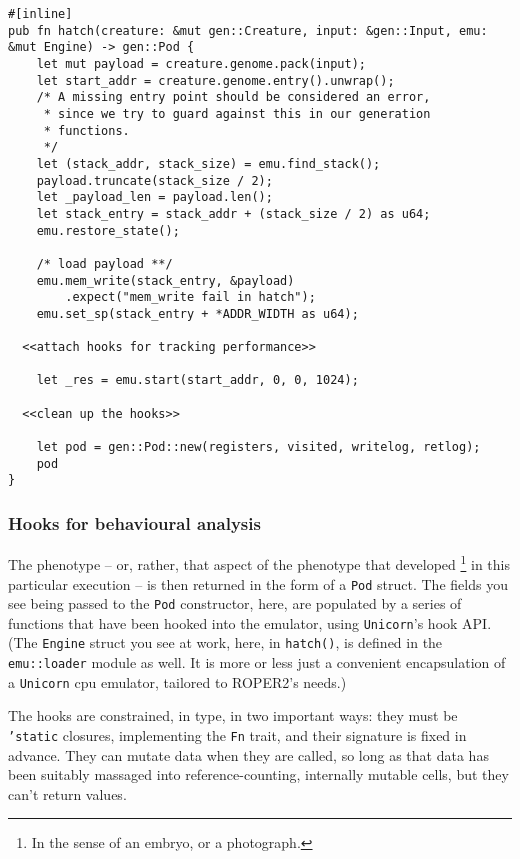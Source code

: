 \documentclass[11pt]{article}
\begin{document}
\lstset{language=rust,label=orge748246,caption= ,captionpos=b,numbers=none}
\begin{lstlisting}
#[inline]
pub fn hatch(creature: &mut gen::Creature, input: &gen::Input, emu: &mut Engine) -> gen::Pod {
    let mut payload = creature.genome.pack(input);
    let start_addr = creature.genome.entry().unwrap();
    /* A missing entry point should be considered an error,
     * since we try to guard against this in our generation
     * functions.
     */
    let (stack_addr, stack_size) = emu.find_stack();
    payload.truncate(stack_size / 2);
    let _payload_len = payload.len();
    let stack_entry = stack_addr + (stack_size / 2) as u64;
    emu.restore_state();

    /* load payload **/
    emu.mem_write(stack_entry, &payload)
        .expect("mem_write fail in hatch");
    emu.set_sp(stack_entry + *ADDR_WIDTH as u64);

  <<attach hooks for tracking performance>>

    let _res = emu.start(start_addr, 0, 0, 1024);

  <<clean up the hooks>>

    let pod = gen::Pod::new(registers, visited, writelog, retlog);
    pod
}
\end{lstlisting}

\subsubsection{Hooks for behavioural analysis}
\label{sec:org7972d7f}
The phenotype -- or, rather, that aspect of the phenotype that developed
\footnote{In the sense of an embryo, or a photograph.} in this particular execution
-- is then returned in the form of a \texttt{Pod} struct. The fields you see being
passed to the \texttt{Pod} constructor, here, are populated by a series of functions
that have been hooked into the emulator, using \texttt{Unicorn}'s hook API. (The
\texttt{Engine} struct you see at work, here, in \texttt{hatch()}, is defined in the
\texttt{emu::loader} module as well. It is more or less just a convenient 
encapsulation of a \texttt{Unicorn} \gls{cpu} emulator, tailored to ROPER2's needs.)

The hooks are constrained, in type, in two important ways: they must be
\texttt{'static} closures, implementing the \texttt{Fn} trait, and their signature is
fixed in advance. They can mutate data when they are called, so long as
that data has been suitably massaged into reference-counting, internally
mutable cells, but they can't return values. 
\end{document}
